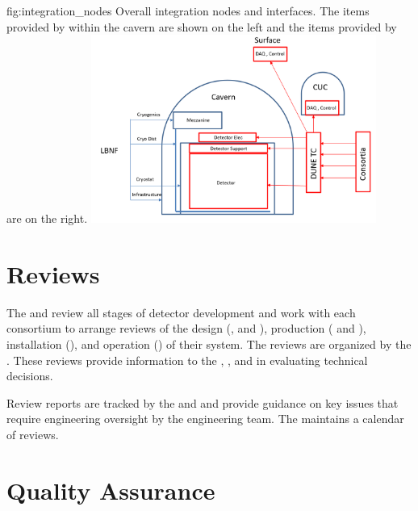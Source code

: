 \begin{dunefigure}{fig:integration_nodes}
  {Overall integration nodes and interfaces. The items
provided by  within the cavern are shown on the left and the items provided by
 are on the right.}
  \includegraphics[width=0.7\textwidth]{graphics/Integration_nodes.png}
\end{dunefigure}




\section{Reviews}
\label{sec:es-tc-reviews}

The  and  review all stages of detector development
and work with each consortium to arrange reviews of the design
(,  and ), production (
and ), installation (), and operation
() of their system. The reviews are organized by the
 .  These
reviews provide information to the , , and 
in evaluating technical decisions. 

Review reports are tracked by the   and  and provide
guidance on key issues that require engineering oversight by the
 engineering team. The   maintains a
calendar of  reviews. 

\section{Quality Assurance}
\label{sec:es-tc-qa}

